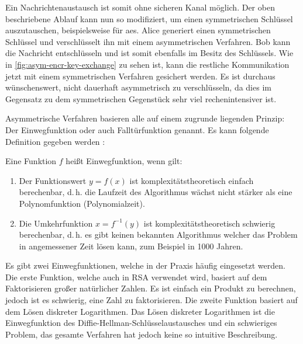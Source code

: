 

\noindent
Ein Nachrichtenaustausch ist somit ohne sicheren Kanal möglich. Der oben beschriebene
Ablauf kann nun so modifiziert, um einen symmetrischen Schlüssel auszutauschen, beispielsweise
für \acs{aes}. Alice generiert einen symmetrischen Schlüssel und verschlüsselt ihn mit einem
asymmetrischen Verfahren. Bob kann die Nachricht entschlüsseln und ist somit ebenfalls
im Besitz des Schlüssels. Wie in \autoref{fig:asym-encr-key-exchange} zu sehen ist,
kann die restliche Kommunikation jetzt mit einem symmetrischen
Verfahren gesichert werden. Es ist durchaus wünschenswert, nicht dauerhaft asymmetrisch
zu verschlüsseln, da dies im Gegensatz zu dem symmetrischen Gegenstück sehr viel
rechenintensiver ist.
\newpage



\noindent
Asymmetrische Verfahren basieren alle auf einem zugrunde liegenden Prinzip:
Der Einwegfunktion oder auch Falltürfunktion genannt. Es kann folgende
Definition gegeben werden \parencite[153]{BOOK:crypto}:

\begin{definition}[Einwegfunktion]
  Eine Funktion $f$ heißt Einwegfunktion, wenn gilt:
  \begin{enumerate}
    \item Der Funktionswert $y = f(x)$ ist komplexitätstheoretisch einfach berechenbar,
          d.\,h. die Laufzeit des Algorithmus wächst
          nicht stärker als eine Polynomfunktion (Polynomialzeit).
    \item Die Umkehrfunktion $x = f^{-1}(y)$ ist komplexitätstheoretisch schwierig berechenbar,
          d.\,h. es gibt keinen bekannten Algorithmus welcher das Problem in angemessener
          Zeit lösen kann, zum Beispiel in 1000 Jahren.
  \end{enumerate}
\end{definition}

\noindent
Es gibt zwei Einwegfunktionen, welche in der Praxis häufig eingesetzt werden.
Die erste Funktion, welche auch in RSA verwendet wird,
basiert auf dem Faktorisieren großer natürlicher Zahlen.
Es ist einfach ein Produkt zu berechnen, jedoch ist es schwierig, eine Zahl zu
faktorisieren. Die zweite Funktion basiert auf dem Lösen diskreter Logarithmen.
Das Lösen diskreter Logarithmen ist die Einwegfunktion des
Diffie-Hellman-Schlüsselaustausches und ein schwieriges Problem,
das gesamte Verfahren hat jedoch keine so intuitive Beschreibung.

